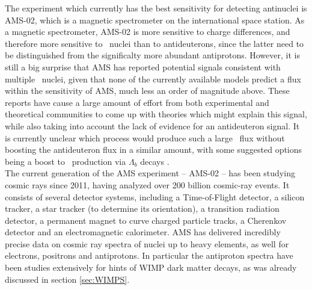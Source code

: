 The experiment which currently has the best sensitivity for detecting antinuclei is AMS-02, which is a magnetic spectrometer on the international space station. As a magnetic spectrometer, AMS-02 is more sensitive to charge differences, and therefore more sensitive to \ahe\ nuclei than to antideuterons, since the latter need to be distinguished from the significalty more abundant antiprotons. However, it is still a big surprise that AMS has reported potential signals consistent with multiple \ahe\ nuclei, given that none of the currently available models predict a flux within the sensitivity of AMS, much less an order of magnitude above. These reports have cause a large amount of effort from both experimental and theoretical communities to come up with theories which might explain this signal, while also taking into account the lack of evidence for an antideuteron signal. It is currently unclear which process would produce such a large \ahe\ flux without boosting the antideuteron flux in a similar amount, with some suggested options being a boost to \ahe\ production via $\Lambda_b$ decays \cite{Winkler_2021}. \\
The current generation of the AMS experiment -- AMS-02 -- has been studying cosmic rays since 2011, having analyzed over 200 billion cosmic-ray events. It consists of several detector systems, including a Time-of-Flight detector, a silicon tracker, a star tracker (to determine its orientation), a transition radiation detector, a permanent magnet to curve charged particle tracks, a Cherenkov detector and an electromagnetic calorimeter. AMS has delivered incredibly precise data on cosmic ray spectra of nuclei up to heavy elements, as well for electrons, positrons and antiprotons. In particular the antiproton spectra have been studies extensively for hints of WIMP dark matter decays, as was already discussed in section \ref{sec:WIMPS}. \\
